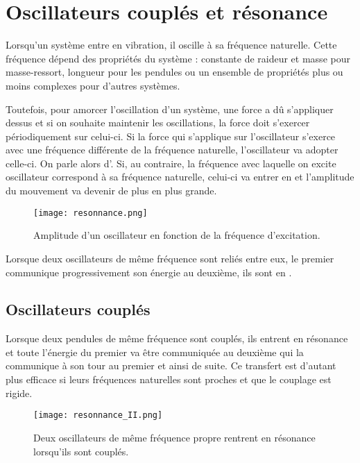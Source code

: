 \chapter{Oscillateurs couplés et résonance}
Lorsqu'un système entre en vibration, il oscille à sa fréquence naturelle. Cette fréquence dépend des propriétés du système : constante de raideur et masse pour masse-ressort, longueur pour les pendules ou un ensemble de propriétés plus ou moins complexes pour d'autres systèmes.

Toutefois, pour amorcer l'oscillation d'un système, une force a dû s'appliquer dessus et si on souhaite maintenir les oscillations, la force doit s'exercer périodiquement sur celui-ci. Si la force qui s'applique sur l'oscillateur s'exerce avec une fréquence différente de la fréquence naturelle, l'oscillateur va adopter celle-ci. On parle alors d'.
Si, au contraire, la fréquence avec laquelle on excite oscillateur correspond à sa fréquence naturelle, celui-ci va entrer en  et l'amplitude du mouvement va devenir de plus en plus grande.

\begin{figure}[h!]
    \centering
    \texttt{[image: resonnance.png]}
    \caption{Amplitude d'un oscillateur en fonction de la fréquence d'excitation.}
    \label{resonnanceI}
\end{figure}

\begin{encadre}
    Lorsque deux oscillateurs de même fréquence sont reliés entre eux, le premier communique progressivement son énergie au deuxième, ils sont en .
\end{encadre}

\newpage

\section{Oscillateurs couplés}
Lorsque deux pendules de même fréquence sont couplés, ils entrent en résonance et toute l'énergie du premier va être communiquée au deuxième qui la communique à son tour au premier et ainsi de suite. Ce transfert est d'autant plus efficace si leurs fréquences naturelles sont proches et que le couplage est rigide.

\begin{figure}[h!]
    \centering
    \texttt{[image: resonnance\_II.png]}
    \caption{Deux oscillateurs de même fréquence propre rentrent en résonance lorsqu'ils sont couplés.}
    \label{resonnanceII}
\end{figure}

